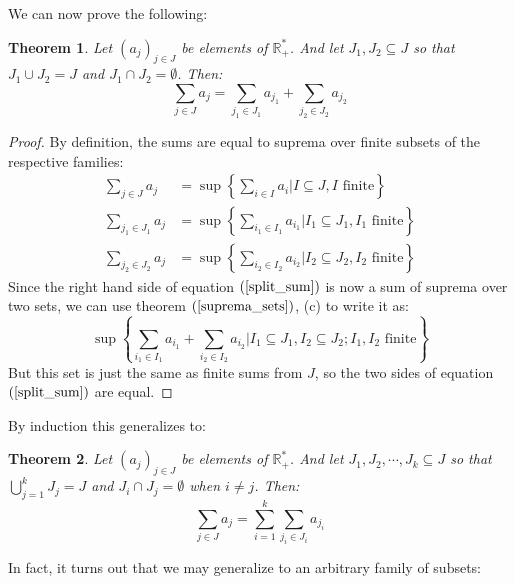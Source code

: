 \documentclass[12pt, a4paper]{article}
\newtheorem{theorem}{Theorem}[section]
\numberwithin{equation}{section}
\begin{document}
We can now prove the following:
\begin{theorem}
Let $(a_j)_{j\in J}$ be elements of $\mathbb{R}_+^*$. And let $J_1,J_2\subseteq J$ so that $J_1\cup J_2=J$ and $J_1\cap J_2=\emptyset$. Then:
\begin{equation}
\label{split_sum}
\sum_{j\in J} a_j = \sum_{j_1\in J_1}a_{j_1} + \sum_{j_2\in J_2}a_{j_2}
\end{equation}
\end{theorem}
\begin{proof}
By definition, the sums are equal to suprema over finite subsets of the respective families:
\begin{align}
\sum_{j\in J} a_j &=\sup\left\{\sum_{i\in I}a_i|I\subseteq J, I\textrm{ finite}\right\}\\
\sum_{j_1\in J_1} a_j &=\sup\left\{\sum_{i_1\in I_1}a_{i_1}|I_1\subseteq J_1, I_1\textrm{ finite}\right\}\\
\sum_{j_2\in J_2} a_j &=\sup\left\{\sum_{i_2\in I_2}a_{i_2}|I_2\subseteq J_2, I_2\textrm{ finite}\right\}
\end{align}
Since the right hand side of equation $(\ref{split_sum})$ is now a sum of suprema over two sets, we can use theorem $(\ref{suprema_sets})$, (c) to write it as:
\begin{equation}
\sup\left\{\sum_{i_1\in I_1}a_{i_1}+\sum_{i_2\in I_2}a_{i_2}|I_1\subseteq J_1, I_2\subseteq J_2; I_1, I_2\textrm{ finite}\right\}
\end{equation}
But this set is just the same as finite sums from $J$, so the two sides of equation $(\ref{split_sum})$ are equal.
\end{proof}

By induction this generalizes to:
\begin{theorem}
Let $(a_j)_{j\in J}$ be elements of $\mathbb{R}_+^*$. And let $J_1,J_2,\cdots,J_k\subseteq J$ so that $\bigcup_{j=1}^k J_j=J$ and $J_i\cap J_j=\emptyset$ when $i\neq j$. Then:
\begin{equation}
\sum_{j\in J} a_j = \sum_{i=1}^k\sum_{j_i\in J_i}a_{j_i}
\end{equation}
\end{theorem}

In fact, it turns out that we may generalize to an arbitrary family of subsets:
\end{document}
